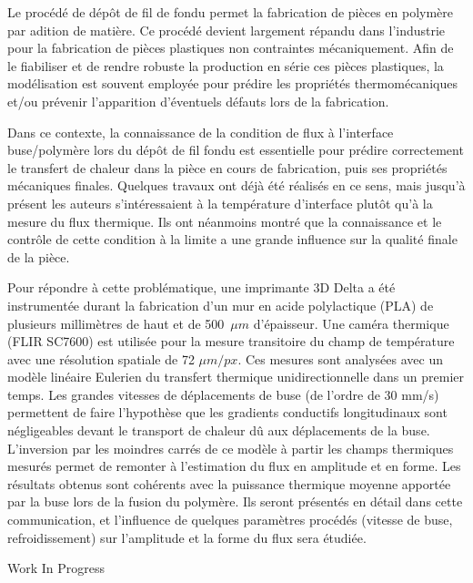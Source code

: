 {\normalsize
Le procédé de dépôt de fil de fondu permet la fabrication de pièces en polymère par adition de matière. Ce procédé devient largement répandu dans l'industrie pour la fabrication de pièces plastiques non contraintes mécaniquement. Afin de le fiabiliser et de rendre robuste la production en série ces pièces plastiques, la modélisation est souvent employée pour prédire les propriétés thermomécaniques et/ou prévenir l'apparition d'éventuels défauts lors de la fabrication.







Dans ce contexte, la connaissance de la condition de flux à l'interface buse/polymère lors du dépôt de fil fondu est essentielle pour prédire correctement le transfert de chaleur dans la pièce en cours de fabrication, puis ses propriétés mécaniques finales. Quelques travaux ont déjà été réalisés en ce sens, mais jusqu'à présent les auteurs s'intéressaient à la température d'interface plutôt qu'à la mesure du flux thermique. Ils ont néanmoins montré que la connaissance et le contrôle de cette condition à la limite a une grande influence sur la qualité finale de la pièce.







Pour répondre à cette problématique, une imprimante 3D Delta a été instrumentée durant la fabrication d'un mur en acide polylactique (PLA) de plusieurs millimètres de haut et de 500~$\unit{\mu m}$ d'épaisseur. Une caméra thermique (FLIR SC7600) est utilisée pour la mesure transitoire du champ de température avec une résolution spatiale de 72 $\unit{\mu m/px}$. Ces mesures sont analysées avec un modèle linéaire Eulerien du transfert thermique unidirectionnelle dans un premier temps. Les grandes vitesses de déplacements de buse (de l'ordre de 30 mm/s) permettent de faire l'hypothèse que les gradients conductifs longitudinaux sont négligeables devant le transport de chaleur dû aux déplacements de la buse. L'inversion par les moindres carrés de ce modèle à partir les champs thermiques mesurés permet de remonter à l'estimation du flux en amplitude et en forme. Les résultats obtenus sont cohérents avec la puissance thermique moyenne apportée par la buse lors de la fusion du polymère. Ils seront présentés en détail dans cette communication, et l'influence de quelques paramètres procédés (vitesse de buse, refroidissement) sur l'amplitude et la forme du flux sera étudiée.

 \vfill Work In Progress

}
 
